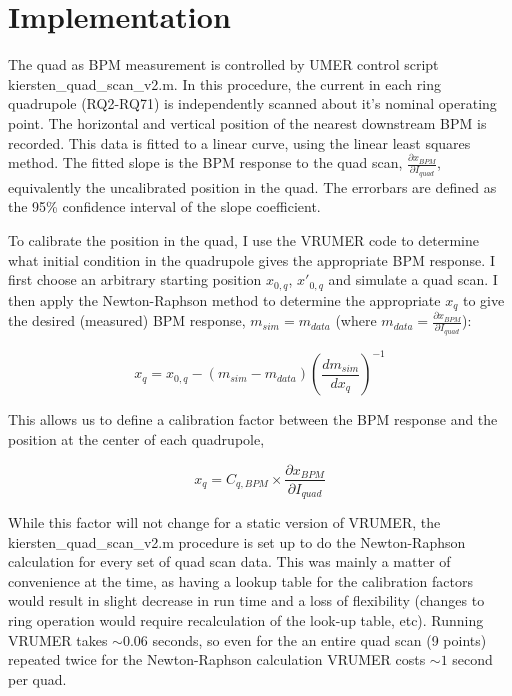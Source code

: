 \section{Implementation} \label{sec:steering:implementation}


The quad as BPM measurement is controlled by UMER control script \newline kiersten\_quad\_scan\_v2.m. 
In this procedure, the current in each ring quadrupole (RQ2-RQ71) is independently scanned about it's nominal 
operating point. The horizontal and vertical position of the nearest downstream BPM is recorded. This data is 
fitted to a linear curve, using the linear least squares method. The fitted slope is the BPM response to the 
quad scan, $\frac{\partial x_{BPM}}{\partial I_{quad}}$, equivalently the uncalibrated position in the quad. 
The errorbars are defined as the 95\% confidence interval of the slope coefficient. 

To calibrate the position in the quad, I use the VRUMER code to determine what initial condition in the quadrupole gives the appropriate BPM response.
I first choose an arbitrary starting position $x_{0,q}$, $x'_{0,q}$ and simulate a quad scan.
I then apply the Newton-Raphson method to determine the appropriate $x_q$ to give the desired (measured) BPM response, $m_{sim} = m_{data}$ (where $m_{data} = \frac{\partial x_{BPM}}{\partial I_{quad}}$): 


\begin{equation}
 x_q = x_{0,q} - \left( m_{sim} - m_{data} \right) \left(\frac{dm_{sim}}{dx_q}\right)^{-1}
\end{equation}

This allows us to define a calibration factor between the BPM response and the position at the center of each quadrupole, 

\begin{equation}
x_q = C_{q,BPM} \times \frac{\partial x_{BPM}}{\partial I_{quad}}
\end{equation}


While this factor will not change for a static version of VRUMER, the \newline  kiersten\_quad\_scan\_v2.m procedure is 
set up to do the Newton-Raphson calculation for every set of quad scan data. This was mainly a matter of convenience at 
the time, as having a lookup table for the calibration factors would result in slight decrease in run time and a loss of 
flexibility (changes to ring operation would require recalculation of the look-up table, etc). Running VRUMER takes $\sim 0.06$ 
seconds, so even for the an entire quad scan (9 points) repeated twice for the Newton-Raphson calculation VRUMER 
costs $\sim 1$ second per quad. 




